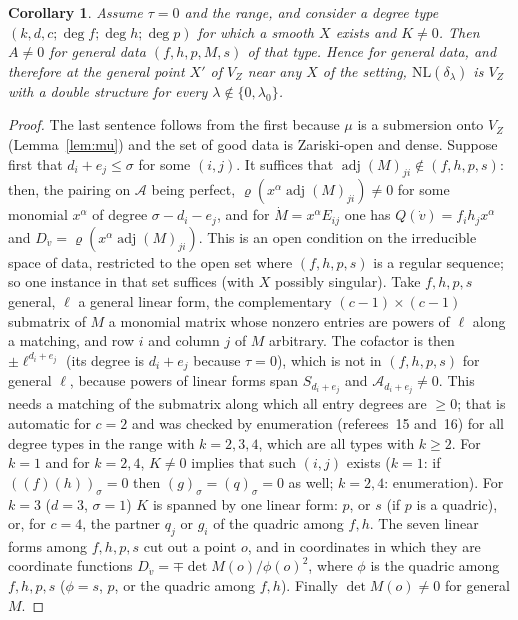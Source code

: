 \documentclass[11pt]{article}
\numberwithin{equation}{section}
\newtheorem{corollary}[theorem]{Corollary}
\theoremstyle{remark}
\newcommand{\NL}{\mathrm{NL}}
\newcommand{\VZ}{V_Z}
\newcommand{\cA}{\mathcal{A}}
\newcommand{\lz}{\lambda_0}
\begin{document}
\begin{corollary}\label{cor:Anz}
Assume $\tau=0$ and the range, and consider a degree type $(k,d,c;\deg f;\deg h;\deg p)$ for which a
smooth $X$ exists and $K\ne0$. Then $A\ne0$ for general data $(f,h,p,M,s)$ of that type. Hence for general data,
and therefore at the general point $X'$ of $\VZ$ near any $X$ of the setting, $\NL(\delta_\lambda)$ is $\VZ$ with a
double structure for every $\lambda\notin\{0,\lz\}$.
\end{corollary}
\begin{proof}
The last sentence follows from the first because $\mu$ is a submersion onto $\VZ$ (Lemma~\ref{lem:mu}) and the
set of good data is Zariski-open and dense. Suppose first that $d_i+e_j\le\sigma$ for some $(i,j)$. It suffices
that $\operatorname{adj}(M)_{ji}\notin(f,h,p,s)$: then, the pairing on $\cA$ being perfect,
$\varrho(x^\alpha\operatorname{adj}(M)_{ji})\ne0$ for some monomial $x^\alpha$ of degree $\sigma-d_i-e_j$, and for
$\dot M=x^\alpha E_{ij}$ one has $Q(\dot v)=f_ih_jx^\alpha$ and $D_{\dot v}=\varrho(x^\alpha\operatorname{adj}(M)_{ji})$.
This is an open condition on the irreducible space of data, restricted to the open set where $(f,h,p,s)$ is a
regular sequence; so one instance in that set suffices (with $X$ possibly singular). Take $f,h,p,s$ general,
$\ell$ a general linear form, the complementary $(c-1)\times(c-1)$ submatrix of $M$ a monomial matrix whose
nonzero entries are powers of $\ell$ along a matching, and row $i$ and column $j$ of $M$ arbitrary. The cofactor
is then $\pm\ell^{d_i+e_j}$ (its degree is $d_i+e_j$ because $\tau=0$), which is not in $(f,h,p,s)$ for general
$\ell$, because powers of linear forms span $S_{d_i+e_j}$ and $\cA_{d_i+e_j}\ne0$. This needs a matching of the
submatrix along which all entry degrees are $\ge0$; that is automatic for $c=2$ and was checked by enumeration
(referees~15 and~16) for all degree types in the range with $k=2,3,4$, which are all types with $k\ge2$. For
$k=1$ and for $k=2,4$, $K\ne0$ implies that such $(i,j)$ exists ($k=1$: if $((f)(h))_\sigma=0$ then
$(g)_\sigma=(q)_\sigma=0$ as well; $k=2,4$: enumeration). For $k=3$ ($d=3$, $\sigma=1$) $K$ is spanned by one linear
form: $p$, or $s$ (if $p$ is a quadric), or, for $c=4$, the partner $q_j$ or $g_i$ of the quadric among $f,h$. The
seven linear forms among $f,h,p,s$ cut out a point $o$, and in coordinates in which they are coordinate
functions $D_{\dot v}=\mp\det M(o)/\phi(o)^2$, where $\phi$ is the quadric among $f,h,p,s$ ($\phi=s$, $p$, or the
quadric among $f,h$). Finally $\det M(o)\ne0$ for general $M$.
\end{proof}
\end{document}
